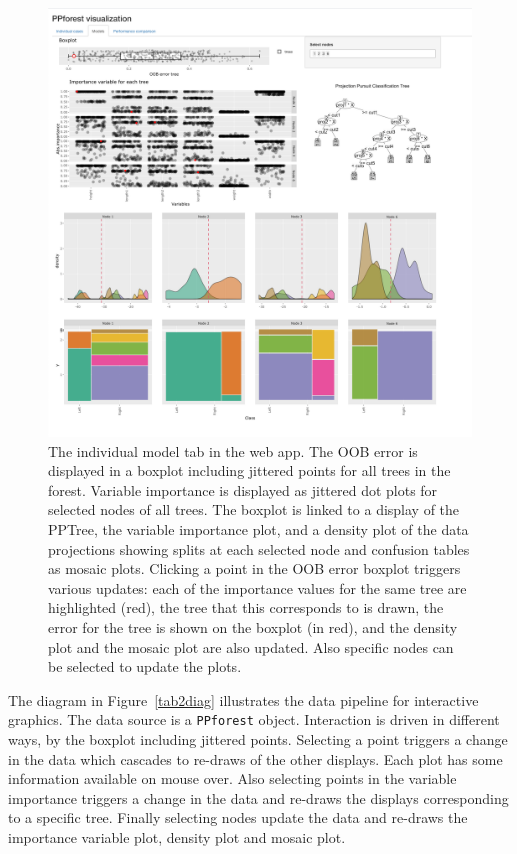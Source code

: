 \documentclass[smallextended,natbib]{svjour3}\usepackage[]{graphicx}\usepackage[]{xcolor}
\begin{document}
\begin{figure}[hbpt]
\centering
\includegraphics[width=1.1\linewidth]{tab2comp.png}
\caption{The individual model tab in the web app. The OOB error is displayed in a boxplot  including jittered points for all trees in the forest. Variable importance is displayed as jittered dot plots for selected nodes of all trees. The boxplot is linked to a display of the PPTree, the variable importance plot, and a density plot of the data projections showing splits at each selected node and confusion tables as mosaic plots. Clicking a point in the OOB error boxplot triggers various updates: each of the importance values for the same tree are highlighted (red), the tree that this corresponds to is drawn, the error for the tree is shown on the boxplot (in red), and the density plot and the mosaic plot are also updated. Also specific nodes can be selected to update the plots.  \label{tab2}}
\end{figure}


The diagram in Figure~\ref{tab2diag} illustrates the data pipeline for interactive graphics.
The data source is a \verb#PPforest# object. Interaction is driven in different ways, by the boxplot including jittered points. Selecting a point triggers a change in the data which cascades to re-draws of the other displays. Each plot has some information available on mouse over. Also selecting points in the variable importance triggers a change in the data and re-draws the displays corresponding to a specific tree. Finally selecting nodes update the data and re-draws the importance variable plot, density plot and mosaic plot.
\end{document}
